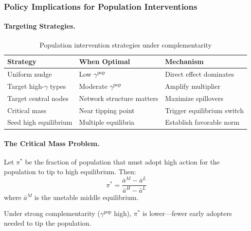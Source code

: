 \subsubsection{Policy Implications for Population Interventions}

\paragraph{Targeting Strategies.}

\begin{table}[h]
\centering
\small
\begin{tabular}{p{3cm}p{4cm}p{5cm}}
\toprule
\textbf{Strategy} & \textbf{When Optimal} & \textbf{Mechanism} \\
\midrule
Uniform nudge & Low $\gamma^{\text{pop}}$ & Direct effect dominates \\
Target high-$\gamma$ types & Moderate $\gamma^{\text{pop}}$ & Amplify multiplier \\
Target central nodes & Network structure matters & Maximize spillovers \\
Critical mass & Near tipping point & Trigger equilibrium switch \\
Seed high equilibrium & Multiple equilibria & Establish favorable norm \\
\bottomrule
\end{tabular}
\caption{Population intervention strategies under complementarity}
\label{tab:population-strategies}
\end{table}

\paragraph{The Critical Mass Problem.}

\begin{proposition}
\label{prop:critical-mass}
Let $\pi^*$ be the fraction of population that must adopt high action for the 
population to tip to high equilibrium. Then:
\begin{equation}
\pi^* = \frac{\bar{a}^M - \bar{a}^L}{\bar{a}^H - \bar{a}^L}
\end{equation}
where $\bar{a}^M$ is the unstable middle equilibrium.
\end{proposition}

Under strong complementarity ($\gamma^{\text{pop}}$ high), $\pi^*$ is lower---fewer 
early adopters needed to tip the population.

